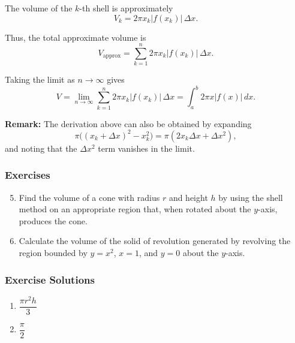 The volume of the $k$-th shell is approximately
\[
V_k = 2\pi x_k |f(x_k)|\,\Delta x.
\]

Thus, the total approximate volume is
\[
V_{\text{approx}} = \sum_{k=1}^{n} 2\pi x_k |f(x_k)|\,\Delta x.
\]

Taking the limit as $n \to \infty$ gives
\[
V = \lim_{n\to\infty} \sum_{k=1}^{n} 2\pi x_k |f(x_k)|\,\Delta x
= \int_a^b 2\pi x |f(x)|\,dx.
\]

\medskip

\textbf{Remark:} The derivation above can also be obtained by expanding
\[
\pi\big((x_k+\Delta x)^2 - x_k^2\big) = \pi(2x_k\Delta x + \Delta x^2),
\]
and noting that the $\Delta x^2$ term vanishes in the limit.

\subsubsection{Exercises}
\label{sss:exer-shell}

\begin{enumerate}
\setcounter{enumi}{4}

\item Find the volume of a cone with radius $r$ and height $h$ by using 
the shell method on an appropriate region that, when rotated about the 
$y$-axis, produces the cone.

\item Calculate the volume of the solid of revolution generated by 
revolving the region bounded by $y=x^2$, $x=1$, and $y=0$ about the 
$y$-axis.
\end{enumerate}

\subsubsection{Exercise Solutions}
\label{sss:exer-sol-shell}

\begin{enumerate}
\item $\dfrac{\pi r^2 h}{3}$
\item $\dfrac{\pi}{2}$
\end{enumerate}

